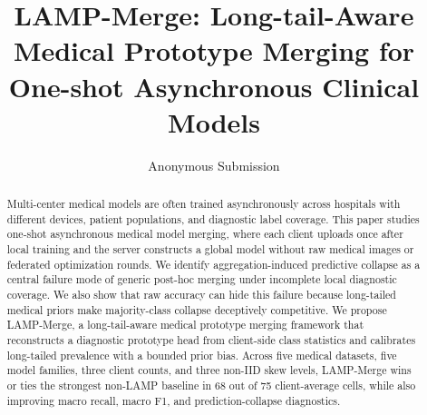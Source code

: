 \documentclass[letterpaper]{article}
\title{LAMP-Merge: Long-tail-Aware Medical Prototype Merging for One-shot Asynchronous Clinical Models}
\author{
    Anonymous Submission
}
\begin{document}
\maketitle

\begin{abstract}
Multi-center medical models are often trained asynchronously across hospitals with different devices, patient populations, and diagnostic label coverage. This paper studies one-shot asynchronous medical model merging, where each client uploads once after local training and the server constructs a global model without raw medical images or federated optimization rounds. We identify aggregation-induced predictive collapse as a central failure mode of generic post-hoc merging under incomplete local diagnostic coverage. We also show that raw accuracy can hide this failure because long-tailed medical priors make majority-class collapse deceptively competitive. We propose LAMP-Merge, a long-tail-aware medical prototype merging framework that reconstructs a diagnostic prototype head from client-side class statistics and calibrates long-tailed prevalence with a bounded prior bias. Across five medical datasets, five model families, three client counts, and three non-IID skew levels, LAMP-Merge wins or ties the strongest non-LAMP baseline in 68 out of 75 client-average cells, while also improving macro recall, macro F1, and prediction-collapse diagnostics.
\end{abstract}




\end{document}
